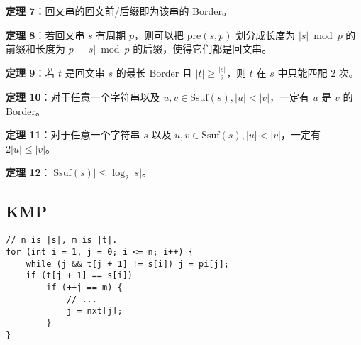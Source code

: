 \begin{tcolorbox}
\textbf{定理 7}：回文串的回文前/后缀即为该串的 Border。
\end{tcolorbox}

\begin{tcolorbox}
\textbf{定理 8}：若回文串 $s$ 有周期 $p$，则可以把 $\mathrm{pre}(s, p)$ 划分成长度为 $|s| \bmod p$ 的前缀和长度为 $p - |s| \bmod p$ 的后缀，使得它们都是回文串。
\end{tcolorbox}

\begin{tcolorbox}
\textbf{定理 9}：若 $t$ 是回文串 $s$ 的最长 Border 且 $|t| \ge \frac{|s|}{2}$，则 $t$ 在 $s$ 中只能匹配 $2$ 次。
\end{tcolorbox}

\begin{tcolorbox}
\textbf{定理 10}：对于任意一个字符串以及 $u, v\in\mathrm{Ssuf}(s), |u| < |v|$，一定有 $u$ 是 $v$ 的 Border。
\end{tcolorbox}

\begin{tcolorbox}
\textbf{定理 11}：对于任意一个字符串 $s$ 以及 $u, v\in\mathrm{Ssuf}(s), |u| < |v|$，一定有 $2|u| \le |v|$。
\end{tcolorbox}

\begin{tcolorbox}
\textbf{定理 12}：$|\mathrm{Ssuf}(s)| \le \log_2|s|$。
\end{tcolorbox}

\subsection{KMP}

\begin{verbatim}
// n is |s|, m is |t|.
for (int i = 1, j = 0; i <= n; i++) {
    while (j && t[j + 1] != s[i]) j = pi[j];
    if (t[j + 1] == s[i])
        if (++j == m) {
            // ...
            j = nxt[j];
        }
}
\end{verbatim}